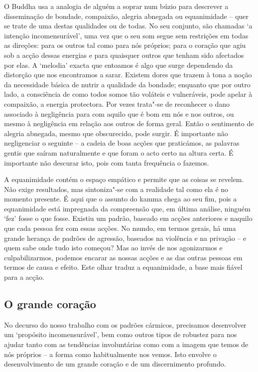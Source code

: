 O Buddha usa a analogia de alguém a soprar num búzio para descrever a
disseminação de bondade, compaixão, alegria abnegada ou equanimidade -- quer se
trate de uma destas qualidades ou de todas. No seu conjunto,
são chamadas `a intenção incomensurável', uma vez que o seu som segue sem
restrições em todas as direções: para os outros tal como para nós próprios; para
o coração que agiu sob a acção dessas energias e para quaisquer outros que
tenham sido afectados por elas. A `melodia' exacta que entoamos é algo que surge
dependendo da distorção que nos encontramos a sarar. Existem dores que trazem à
tona a noção da necessidade básica de nutrir a qualidade da bondade; enquanto
que por outro lado, a consciência de como todos somos tão voláteis e
vulneráveis, pode apelar à compaixão, a energia protectora. Por vezes trata"-se
de reconhecer o dano associado à negligência para com aquilo que é bom em nós e
nos outros, ou mesmo à negligência em relação aos outros de forma geral. Então o
sentimento de alegria abnegada, mesmo que obscurecido, pode surgir. É importante
não negligenciar o seguinte -- a cadeia de boas acções que praticámos, as
palavras gentis que saíram naturalmente e que foram o acto certo na altura
certa. É importante não descurar isto, pois com tanta frequência o fazemos.

A equanimidade contém o espaço empático e permite que as coisas se revelem. Não
exige resultados, mas sintoniza"-se com a realidade tal como ela é no momento
presente. É aqui que o assunto do kamma chega ao seu fim, pois a equanimidade
está impregnada da compreensão que, em última análise, ninguém `fez' fosse o que
fosse. Existiu um padrão, baseado em acções anteriores e naquilo que cada pessoa
fez com essas acções. No mundo, em termos gerais, há uma grande herança de
padrões de agressão, baseados na violência e na privação -- e quem sabe onde
tudo isto começou? Mas ao invés de nos agonizarmos e culpabilizarmos, podemos
encarar as nossas acções e as das outras pessoas em termos de causa e efeito.
Este olhar traduz a equanimidade, a base mais fiável para a acção.

\subsection{O grande coração}

No decurso do nosso trabalho com os padrões cármicos, precisamos desenvolver um
`propósito incomensurável', bem como outros tipos de robustez para nos ajudar
tanto com as tendências involuntárias como com a imagem que temos de nós
próprios -- a forma como habitualmente nos vemos. Isto envolve o desenvolvimento
de um grande coração e de um discernimento profundo.

